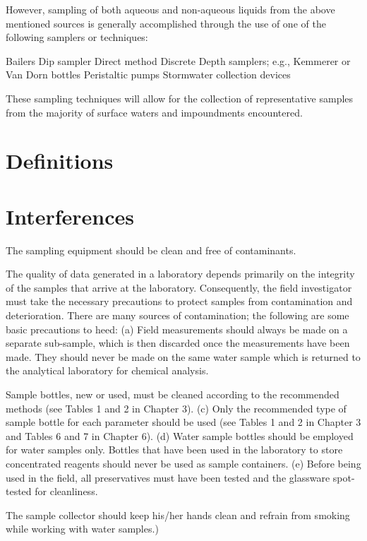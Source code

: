 \documentclass[12pt]{../SOP4_alpha}\usepackage[]{graphicx}\usepackage[]{xcolor}
\begin{document}
However, sampling of both aqueous and non-aqueous liquids from the above mentioned
sources is generally accomplished through the use of one of the following samplers or
techniques:


\NP Bailers
\NP Dip sampler
\NP Direct method
\NP Discrete Depth samplers; e.g., Kemmerer or Van Dorn bottles
\NP Peristaltic pumps
\NP Stormwater collection devices


These sampling techniques will allow for the collection of representative samples from
the majority of surface waters and impoundments encountered.

\section{Definitions}



\section{Interferences}

\NP The sampling equipment should be clean and free of contaminants.

\NP The quality of data generated in a laboratory depends primarily on the integrity of the samples that arrive at the laboratory. Consequently, the field investigator must take the necessary precautions to protect samples from contamination and deterioration. There are many sources of contamination; the following are some basic precautions to heed: (a) Field measurements should always be made on a separate sub-sample, which is then discarded once the measurements have been made. They should never be made on the same water sample which is returned to the analytical laboratory for chemical analysis.

\NP Sample bottles, new or used, must be cleaned according to the recommended methods (see Tables 1 and 2 in Chapter 3). (c) Only the recommended type of sample bottle for each parameter should be used (see Tables 1 and 2 in Chapter 3 and Tables 6 and 7 in Chapter 6). (d) Water sample bottles should be employed for water samples only. Bottles that have been used in the laboratory to store concentrated reagents should never be used as sample containers. (e) Before being used in the field, all preservatives must have been tested and the glassware spot-tested for cleanliness. 

\NP The sample collector should keep his/her hands clean and refrain from smoking while working with water samples.)
\end{document}
